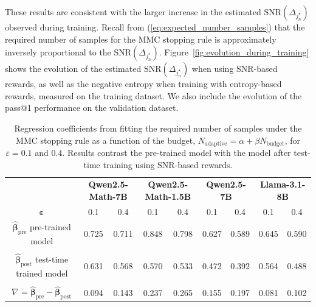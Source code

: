 These results are consistent with the larger increase in the estimated ${\text{SNR}}(\Delta_{j^\star_n})$ observed during training.
Recall from (\ref{eq:expected_number_samples}) that the required number of samples for the MMC stopping rule is approximately inversely proportional to the ${\text{SNR}}(\Delta_{j^\star_n})$. 
Figure~\ref{fig:evolution_during_training} shows the evolution of the estimated ${\text{SNR}}(\Delta_{j^\star_n})$ when using SNR-based rewards, as well as the negative entropy when training with entropy-based rewards, measured on the training dataset. We also include the evolution of the pass@1 performance on the validation dataset.


\begin{table}[ht!]
\caption{Regression coefficients from fitting the required number of samples under the MMC stopping rule as a function of the budget, ${N}_{\text{adaptive}} = \alpha + \beta {N}_{\text{budget}}$, for $\varepsilon = 0.1$ and $0.4$. Results contrast the pre-trained model with the model after test-time training using SNR-based rewards.}
\label{tab:ratio_adaptive_sampling_pre_post_trained}
\begin{center}
\footnotesize
\begin{tabular}{ccccccccc}
\toprule
  & \multicolumn{2}{c}{\textbf{Qwen2.5-Math-7B} }&\multicolumn{2}{c}{\textbf{Qwen2.5-Math-1.5B}} &\multicolumn{2}{c}{\textbf{Qwen2.5-7B}}&\multicolumn{2}{c}{\textbf{Llama-3.1-8B}}\\
\cmidrule(lr){2-3}
\cmidrule(lr){4-5}
\cmidrule(lr){6-7}
\cmidrule(lr){8-9}
 $\bm \varepsilon$ &0.1&0.4 & 0.1&0.4& 0.1&0.4& 0.1&0.4\\
\midrule
$\bm{\hat\beta}_{\text{pre}}$ pre-trained model  &0.725& 0.711&0.848 &0.798 & 0.627& 0.589& 0.645& 0.590\\
\\
$\bm{\hat\beta}_{\text{post}}$ test-time trained model &0.631 & 0.568& 0.570& 0.533 & 0.472&0.392& 0.564& 0.488\\
\\
$\nabla = \bm{\hat\beta}_{\text{pre}}-\bm{\hat\beta}_{\text{post}}$ & 0.094& 0.143& 0.237&0.265& 0.155& 0.197& 0.081& 0.102\\
\bottomrule
\end{tabular}
\end{center}
\end{table}
\normalsize



